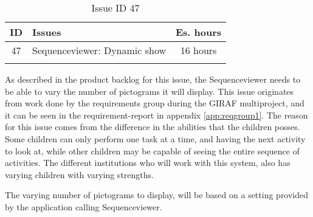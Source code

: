 \begin{longtable} { | c | p{12cm} | c | } 
\hline
	ID 	&	Issues	&		 Es. hours \\\hline
	 47	&	Sequenceviewer: Dynamic show	&	16 hours \\\hline
\caption{Issue ID 47}
\label{tab:spr3_SVdynamicshow}
\end{longtable}

As described in the product backlog for this issue, the Sequenceviewer needs to be able to vary the number of pictograms it will display. This issue originates from work done by the requirements group during the GIRAF multiproject, and it can be seen in the requirement-report in appendix \ref{app:reqgroup1}. The reason for this issue comes from the difference in the abilities that the children posses. Some children can only perform one task at a time, and having the next activity to look at, while other children may be capable of seeing the entire sequence of activities. The different institutions who will work with this system, also has varying children with varying strengths.

The varying number of pictograms to display, will be based on a setting provided by the application calling Sequenceviewer. 
